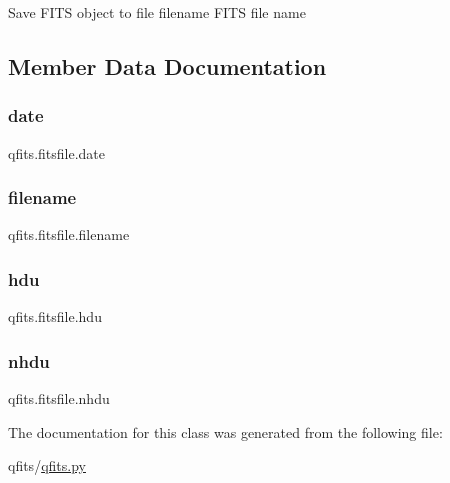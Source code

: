 \begin{DoxyVerb}Save FITS object to file
    filename   FITS file name
\end{DoxyVerb}
 

\subsection{Member Data Documentation}
\mbox{\label{classqfits_1_1fitsfile_a843327c2e5b4722c6df053c47105bade}} 
\subsubsection{\texorpdfstring{date}{date}}
{\footnotesize\ttfamily qfits.\+fitsfile.\+date}

\mbox{\label{classqfits_1_1fitsfile_a576ce29b9c2bb364b4588e1925bdff87}} 
\subsubsection{\texorpdfstring{filename}{filename}}
{\footnotesize\ttfamily qfits.\+fitsfile.\+filename}

\mbox{\label{classqfits_1_1fitsfile_a25a8aba36e2c82b9567c78e054742bd4}} 
\subsubsection{\texorpdfstring{hdu}{hdu}}
{\footnotesize\ttfamily qfits.\+fitsfile.\+hdu}

\mbox{\label{classqfits_1_1fitsfile_af54a0303e40b6ac06e3e58f1d27c850d}} 
\subsubsection{\texorpdfstring{nhdu}{nhdu}}
{\footnotesize\ttfamily qfits.\+fitsfile.\+nhdu}



The documentation for this class was generated from the following file\+:\begin{DoxyCompactItemize}
\item 
qfits/\hyperlink{qfits_8py}{qfits.\+py}\end{DoxyCompactItemize}
